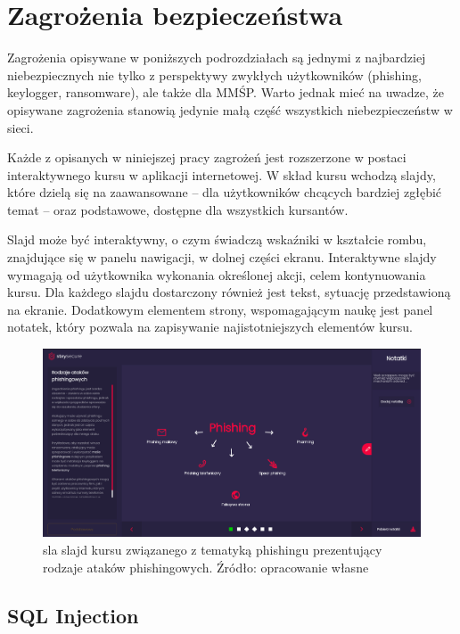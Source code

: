 \documentclass[12pt,twoside]{article}
\begin{document}
\clearpage
\section{Zagrożenia bezpieczeństwa}

Zagrożenia opisywane w poniższych podrozdziałach są jednymi z najbardziej niebezpiecznych nie tylko z perspektywy zwykłych użytkowników (phishing, keylogger, ransomware), ale także dla MMŚP. Warto jednak mieć na uwadze, że opisywane zagrożenia stanowią jedynie małą część wszystkich niebezpieczeństw w sieci.

Każde z opisanych w niniejszej pracy zagrożeń jest rozszerzone w postaci interaktywnego kursu w aplikacji internetowej. W skład kursu wchodzą slajdy, które dzielą się na zaawansowane -- dla użytkowników chcących bardziej zgłębić temat -- oraz podstawowe, dostępne dla wszystkich kursantów. 

Slajd może być interaktywny, o czym świadczą wskaźniki w kształcie rombu, znajdujące się w panelu nawigacji, w dolnej części ekranu. Interaktywne slajdy wymagają od użytkownika wykonania określonej akcji, celem kontynuowania kursu. Dla każdego slajdu dostarczony również jest tekst, sytuację przedstawioną na ekranie. Dodatkowym elementem strony, wspomagającym naukę jest panel notatek, który pozwala na zapisywanie najistotniejszych elementów kursu.

\begin{figure}[H]
	\centering
	\includegraphics[width=1\linewidth]{figures/slide-tutorial}
	\caption{ sla slajd kursu związanego z tematyką phishingu prezentujący rodzaje ataków phishingowych. Źródło: opracowanie własne}
\end{figure}

\clearpage
\subsection{SQL Injection}
\end{document}
